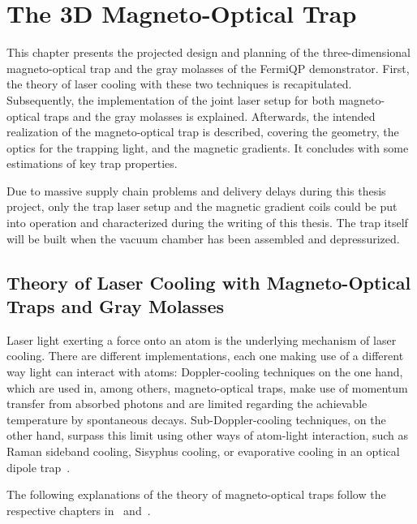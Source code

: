 \renewcommand{\imagepath}{../30-mot/img}

\chapter{The 3D Magneto-Optical Trap}\label{ch:mot}

This chapter presents the projected design and planning of the three-dimensional magneto-optical trap and the gray molasses of the FermiQP demonstrator. First, the theory of laser cooling with these two techniques is recapitulated. Subsequently, the implementation of the joint laser setup for both magneto-optical traps and the gray molasses is explained. Afterwards, the intended realization of the magneto-optical trap is described, covering the geometry, the optics for the trapping light, and the magnetic gradients. It concludes with some estimations of key trap properties.

Due to massive supply chain problems and delivery delays during this thesis project, only the trap laser setup and the magnetic gradient coils could be put into operation and characterized during the writing of this thesis. The trap itself will be built when the vacuum chamber has been assembled and depressurized.

\section{Theory of Laser Cooling with Magneto-Optical Traps and Gray Molasses}\label{ch:mot_theory}
Laser light exerting a force onto an atom is the underlying mechanism of laser cooling. There are different implementations, each one making use of a different way light can interact with atoms: Doppler-cooling techniques on the one hand, which are used in, among others, magneto-optical traps, make use of momentum transfer from absorbed photons and are limited regarding the achievable temperature by spontaneous decays. Sub-Doppler-cooling techniques, on the other hand, surpass this limit using other ways of atom-light interaction, such as Raman sideband cooling, Sisyphus cooling, or evaporative cooling in an optical dipole trap~\cite{foot_atomic_2005}.

The following explanations of the theory of magneto-optical traps follow the respective chapters in~\cite{foot_atomic_2005} and~\cite{metcalf_laser_1999}.

